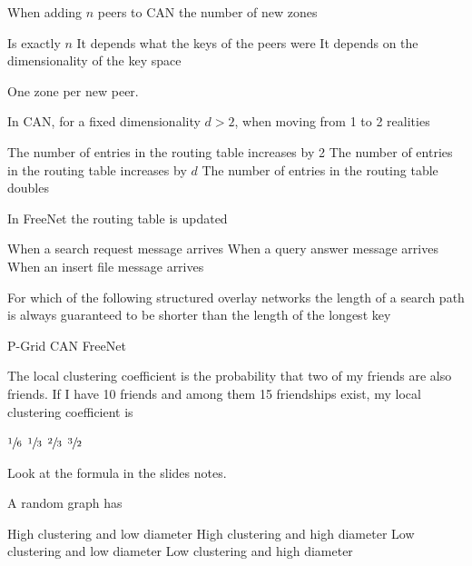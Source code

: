 \documentclass[12pt,a4paper,answers]{exam} %
\begin{document}
\begin{flushleft}
\begin{multicols*}{2}
\begin{questions}
\question When adding $n$ peers to CAN the number of new zones
\begin{checkboxes}
\CorrectChoice Is exactly $n$
\choice It depends what the keys of the peers were
\choice It depends on the dimensionality of the key space
\end{checkboxes}
\begin{solution}
One zone per new peer.
\end{solution}

\question In CAN, for a fixed dimensionality $d>2$, when moving from 1 to 2 realities
\begin{checkboxes}
\choice  The number of entries in the routing table increases by 2
\choice The number of entries in the routing table increases by $d$
\CorrectChoice The number of entries in the routing table doubles
\end{checkboxes}

\question In FreeNet the routing table is updated
\begin{checkboxes}
\choice When a search request message arrives
\CorrectChoice When a query answer message arrives
\choice When an insert file message arrives
\end{checkboxes}

\question For which of the following structured overlay networks the length of a search path is always guaranteed to be shorter than the length of the longest key
\begin{checkboxes}
\CorrectChoice P-Grid
\choice CAN
\choice FreeNet
\end{checkboxes}

\question The local clustering coefficient is the probability that two of my friends are also friends. If I have 10 friends and among them 15 friendships exist, my local clustering coefficient is
\begin{checkboxes}
\choice $\sfrac{1}{6}$
\CorrectChoice $\sfrac{1}{3}$
\choice $\sfrac{2}{3}$
\choice $\sfrac{3}{2}$
\end{checkboxes}
\begin{solution}
Look at the formula in the slides notes.
\end{solution}

\question A random graph has
\begin{checkboxes}
\choice High clustering and low diameter
\choice High clustering and high diameter
\CorrectChoice Low clustering and low diameter
\choice Low clustering and high diameter
\end{checkboxes}


\end{questions}
\end{multicols*}
\end{flushleft}
\end{document}
